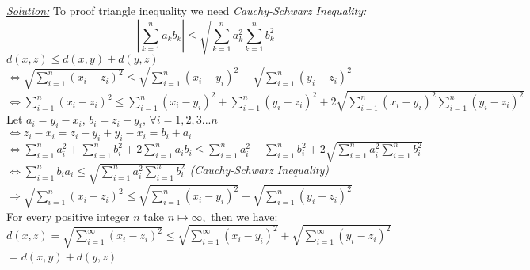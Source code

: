 \documentclass{amsbook}
\begin{document}


\begin{tcolorbox}[enhanced,attach boxed title to top center={yshift=-3mm,yshifttext=-1mm},
  colback=blue!5!white,colframe=blue!75!black,colbacktitle=red!80!black,
  title={$(\mathbb{L}^n,d)$ is a metric space, $d=\sqrt{\sum_{i=1}^{\infty}(x_i-y_i)^2}:$:},fonttitle=\bfseries,
  boxed title style={size=small,colframe=red!50!black} ]
     \textit{\color{blue}\underline{Solution:}}
     To proof triangle inequality we need \textit{\color{blue}Cauchy-Schwarz	Inequality:}\\
{$$\left |\sum_{k=1}^{n}a_k b_k \right |\leq \sqrt{\sum_{k=1}^{n}a_k^2 \sum_{k=1}^{n}b_k^2}$$}
$d(x,z)\leq d(x,y)+d(y,z)$\\
$\Leftrightarrow \sqrt{\sum_{i=1}^{n}(x_i-z_i)^2}\leq 
\sqrt{\sum_{i=1}^{n}(x_i-y_i)^2}+\sqrt{\sum_{i=1}^{n}(y_i-z_i)^2}$\\
$\Leftrightarrow \sum_{i=1}^{n}(x_i-z_i)^2\leq 
\sum_{i=1}^{n}(x_i-y_i)^2+\sum_{i=1}^{n}(y_i-z_i)^2+2\sqrt{\sum_{i=1}^{n}(x_i-y_i)^2\sum_{i=1}^{n}(y_i-z_i)^2}$\\
Let $a_i=y_i-x_i$,  $b_i=z_i-y_i$, $\forall i=1,2,3...n$\\
$\Leftrightarrow z_i-x_i=z_i-y_i+y_i-x_i=b_i+a_i$\\
$\Leftrightarrow \sum_{i=1}^{n}a_i^2+ \sum_{i=1}^{n}b_i^2+2\sum_{i=1}^{n}a_i b_i\leq 
\sum_{i=1}^{n}a_i^2+\sum_{i=1}^{n}b_i^2+2\sqrt{\sum_{i=1}^{n}a_i^2\sum_{i=1}^{n} b_i^2}$
$\Leftrightarrow \sum_{i=1}^{n}b_i a_i\leq \sqrt{\sum_{i=1}^{n}a_i^2\sum_{i=1}^{n} b_i^2}$ 
\textit{\color{blue}(Cauchy-Schwarz Inequality)}\\
$\Rightarrow\sqrt{\sum_{i=1}^{n}(x_i-z_i)^2}\leq 
\sqrt{\sum_{i=1}^{n}(x_i-y_i)^2}+\sqrt{\sum_{i=1}^{n}(y_i-z_i)^2}$\\
For every positive integer $n$ take $n\mapsto\infty,$ then we have:\\
$d(x,z)=\sqrt{\sum_{i=1}^{\infty}(x_i-z_i)^2}\leq
\sqrt{\sum_{i=1}^{\infty}(x_i-y_i)^2}+\sqrt{\sum_{i=1}^{\infty}(y_i-z_i)^2}$\\
$=d(x,y)+d(y,z)$\
\end{tcolorbox}

\end{document}
